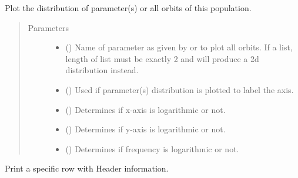 \documentclass[letterpaper,10pt,english]{sphinxmanual}
\begin{document}
\begin{fulllineitems}
\begin{fulllineitems}
\label{\detokenize{modules/population:population.Population.plot_distribution}}
Plot the distribution of parameter(s) or all orbits of this population.
\begin{quote}\begin{description}
\item[{Parameters}] \leavevmode\begin{itemize}
\item {} 
 () \textendash{} Name of parameter as given by  or  to plot all orbits. If a list, length of list must be exactly 2 and will produce a 2d distribution instead.

\item {} 
 () \textendash{} Used if parameter(s) distribution is plotted to label the axis.

\item {} 
 () \textendash{} Determines if x-axis is logarithmic or not.

\item {} 
 () \textendash{} Determines if y-axis is logarithmic or not.

\item {} 
 () \textendash{} Determines if frequency is logarithmic or not.

\end{itemize}

\end{description}\end{quote}

\end{fulllineitems}


\begin{fulllineitems}
\label{\detokenize{modules/population:population.Population.print_row}}
Print a specific row with Header information.


\end{fulllineitems}
\end{fulllineitems}
\end{document}
